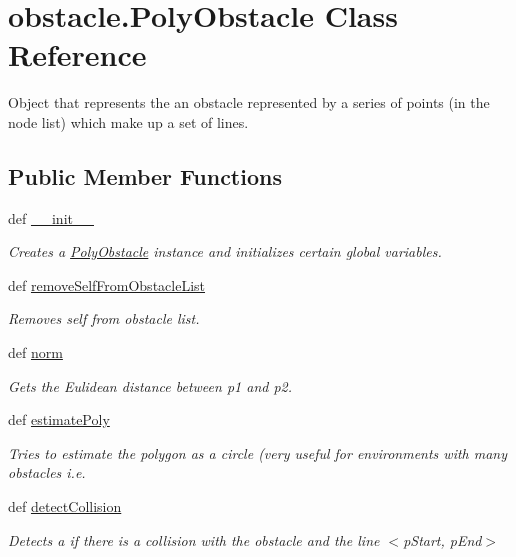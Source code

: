 \hypertarget{classobstacle_1_1PolyObstacle}{\section{obstacle.\-Poly\-Obstacle Class Reference}
\label{classobstacle_1_1PolyObstacle}
}


Object that represents the an obstacle represented by a series of points (in the node list) which make up a set of lines.  


\subsection*{Public Member Functions}
\begin{DoxyCompactItemize}
\item 
def \hyperlink{classobstacle_1_1PolyObstacle_aa92e181aa910e2cd8c110047fe10dc83}{\-\_\-\-\_\-init\-\_\-\-\_\-}
\begin{DoxyCompactList}\small\item\em Creates a \hyperlink{classobstacle_1_1PolyObstacle}{Poly\-Obstacle} instance and initializes certain global variables. \end{DoxyCompactList}\item 
def \hyperlink{classobstacle_1_1PolyObstacle_a55c9604219c6622ad4a633c62fdbb058}{remove\-Self\-From\-Obstacle\-List}
\begin{DoxyCompactList}\small\item\em Removes self from obstacle list. \end{DoxyCompactList}\item 
def \hyperlink{classobstacle_1_1PolyObstacle_a3392ccb4d22e752b0f150af354b16862}{norm}
\begin{DoxyCompactList}\small\item\em Gets the Eulidean distance between p1 and p2. \end{DoxyCompactList}\item 
def \hyperlink{classobstacle_1_1PolyObstacle_ab2833da8e0c16a191ae373af40a75b46}{estimate\-Poly}
\begin{DoxyCompactList}\small\item\em Tries to estimate the polygon as a circle (very useful for environments with many obstacles i.\-e. \end{DoxyCompactList}\item 
def \hyperlink{classobstacle_1_1PolyObstacle_a2a3283cffb3239c8777b85a83af5ee8c}{detect\-Collision}
\begin{DoxyCompactList}\small\item\em Detects a if there is a collision with the obstacle and the line $<$p\-Start, p\-End$>$ \end{DoxyCompactList}\item 

\end{DoxyCompactItemize}
